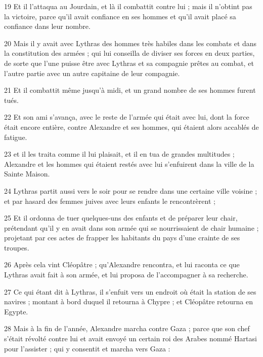 \par 19 Et il l'attaqua au Jourdain, et là il combattit contre lui ; mais il n'obtint pas la victoire, parce qu'il avait confiance en ses hommes et qu'il avait placé sa confiance dans leur nombre.

\par 20 Mais il y avait avec Lythras des hommes très habiles dans les combats et dans la constitution des armées ; qui lui conseilla de diviser ses forces en deux parties, de sorte que l'une puisse être avec Lythras et sa compagnie prêtes au combat, et l'autre partie avec un autre capitaine de leur compagnie.

\par 21 Et il combattit même jusqu'à midi, et un grand nombre de ses hommes furent tués.

\par 22 Et son ami s'avança, avec le reste de l'armée qui était avec lui, dont la force était encore entière, contre Alexandre et ses hommes, qui étaient alors accablés de fatigue.

\par 23 et il les traita comme il lui plaisait, et il en tua de grandes multitudes ; Alexandre et les hommes qui étaient restés avec lui s'enfuirent dans la ville de la Sainte Maison.

\par 24 Lythras partit aussi vers le soir pour se rendre dans une certaine ville voisine ; et par hasard des femmes juives avec leurs enfants le rencontrèrent ;

\par 25 Et il ordonna de tuer quelques-uns des enfants et de préparer leur chair, prétendant qu'il y en avait dans son armée qui se nourrissaient de chair humaine ; projetant par ces actes de frapper les habitants du pays d'une crainte de ses troupes.

\par 26 Après cela vint Cléopâtre ; qu'Alexandre rencontra, et lui raconta ce que Lythras avait fait à son armée, et lui proposa de l'accompagner à sa recherche.

\par 27 Ce qui étant dit à Lythras, il s'enfuit vers un endroit où était la station de ses navires ; montant à bord duquel il retourna à Chypre ; et Cléopâtre retourna en Egypte.

\par 28 Mais à la fin de l'année, Alexandre marcha contre Gaza ; parce que son chef s'était révolté contre lui et avait envoyé un certain roi des Arabes nommé Hartasi pour l'assister ; qui y consentit et marcha vers Gaza :

